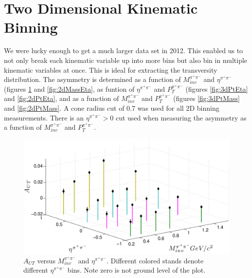 \documentclass[abstract = on,listof=totoc, bibliography=totoc]{scrreprt}
\newcommand{\ptpair}{P_{T}^{\pi^+\pi^-}}
\newcommand{\mpair}{M_{inv}^{\pi^+\pi^-}}
\newcommand{\etapair}{\eta^{\pi^+\pi^-}}
\begin{document}
\section{Two Dimensional Kinematic Binning}
\label{sec:2dresults}

We were lucky enough to get a much larger data set in 2012. This enabled us to not only break each kinematic variable up into more bins but also bin in multiple kinematic variables at once. This is ideal for extracting the transversity distribution. The asymmetry is determined as a function of $\mpair$ and $\etapair$ (figures \ref{fig:3dmassEta} and \ref{fig:2dMassEta}, as funtion of $\etapair$ and $\ptpair$ (figures \ref{fig:3dPtEta} and \ref{fig:2dPtEta}, and as a function of $\mpair$ and $\ptpair$ (figures \ref{fig:3dPtMass} and \ref{fig:2dPtMass}. A cone radius cut of 0.7 was used for all 2D binning measurements. There is an $\etapair > 0$ cut used when measuring the asymmetry as a function of $\mpair$ and $\ptpair$.  




\begin{figure}
\begin{center}
\includegraphics[width = 1\textwidth]{massEta3d82415}
\caption[Asymmetry vs $\etapair$ and $\mpair$ 2D binning]{$A_{UT}$ versus $\mpair$ and $\etapair$. Different colored stands denote different $\etapair$ bins. Note zero is not ground level of the plot.}
\label{fig:3dmassEta}
\end{center}
\end{figure}
\end{document}
